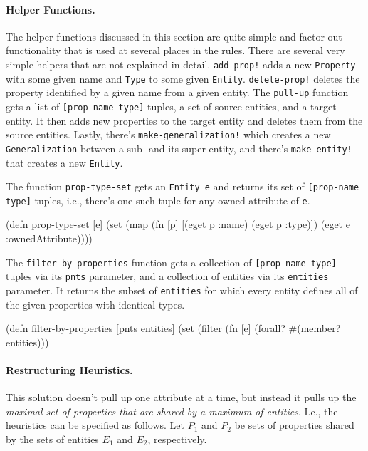 \documentclass[submission]{eptcs}
\begin{document}
\paragraph{Helper Functions.}

The helper functions discussed in this section are quite simple and factor out
functionality that is used at several places in the rules.  There are several
very simple helpers that are not explained in detail.  \verb|add-prop!| adds a
new \verb|Property| with some given name and \verb|Type| to some given
\verb|Entity|.  \verb|delete-prop!| deletes the property identified by a given
name from a given entity.  The \verb|pull-up| function gets a list of
\verb|[prop-name type]| tuples, a set of source entities, and a target entity.
It then adds new properties to the target entity and deletes them from the
source entities.  Lastly, there's \verb|make-generalization!| which creates a
new \verb|Generalization| between a sub- and its super-entity, and there's
\verb|make-entity!| that creates a new \verb|Entity|.

The function \verb|prop-type-set| gets an \verb|Entity e| and returns its set
of \verb|[prop-name type]| tuples, i.e., there's one such tuple for any owned
attribute of \verb|e|.
\begin{clojurecode}
(defn prop-type-set [e]
  (set (map (fn [p] [(eget p :name) (eget p :type)])
            (eget e :ownedAttribute))))
\end{clojurecode}
The \verb|filter-by-properties| function gets a collection of
\verb|[prop-name type]| tuples via its \verb|pnts| parameter, and a collection
of entities via its \verb|entities| parameter.  It returns the subset of
\verb|entities| for which every entity defines all of the given properties with
identical types.
\begin{clojurecode}
(defn filter-by-properties [pnts entities]
  (set (filter (fn [e] (forall? #(member? %
               entities)))
\end{clojurecode}


\paragraph{Restructuring Heuristics.}

This solution doesn't pull up one attribute at a time, but instead it pulls up
the \emph{maximal set of properties that are shared by a maximum of entities}.
I.e., the heuristics can be specified as follows.  Let $P_1$ and $P_2$ be sets
of properties shared by the sets of entities $E_1$ and $E_2$, respectively.
\end{document}
